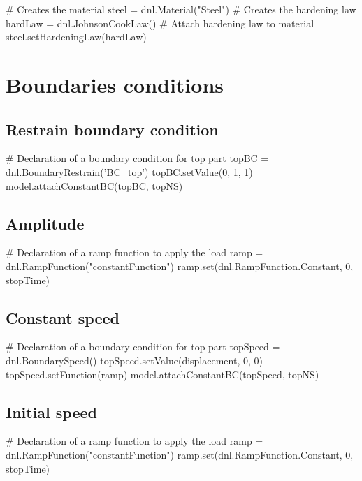 \begin{PythonListing}
# Creates the material
steel = dnl.Material("Steel")
# Creates the hardening law
hardLaw = dnl.JohnsonCookLaw()
# Attach hardening law to material
steel.setHardeningLaw(hardLaw)
\end{PythonListing}

\section{Boundaries conditions}

\subsection{Restrain boundary condition}

\begin{PythonListing}
# Declaration of a boundary condition for top part
topBC = dnl.BoundaryRestrain('BC_top')
topBC.setValue(0, 1, 1)
model.attachConstantBC(topBC, topNS)
\end{PythonListing}

\subsection{Amplitude}

\begin{PythonListing}
# Declaration of a ramp function to apply the load
ramp = dnl.RampFunction("constantFunction")
ramp.set(dnl.RampFunction.Constant, 0, stopTime)
\end{PythonListing}

\subsection{Constant speed}

\begin{PythonListing}
# Declaration of a boundary condition for top part
topSpeed = dnl.BoundarySpeed()
topSpeed.setValue(displacement, 0, 0)
topSpeed.setFunction(ramp)
model.attachConstantBC(topSpeed, topNS)
\end{PythonListing}

\subsection{Initial speed}

\begin{PythonListing}
# Declaration of a ramp function to apply the load
ramp = dnl.RampFunction("constantFunction")
ramp.set(dnl.RampFunction.Constant, 0, stopTime)
\end{PythonListing}

